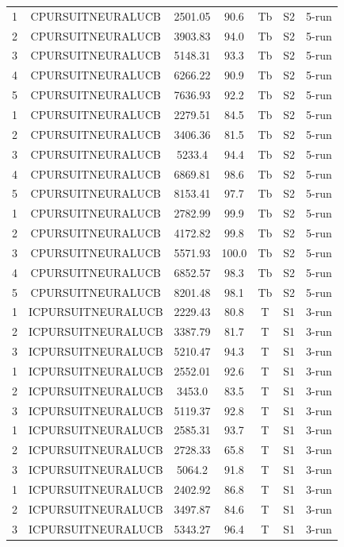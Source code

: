 \documentclass[11pt]{article}
\begin{document}
\begin{center}
\begin{longtable}{|c|c|c|c|c|c|c|}
1 & CPURSUITNEURALUCB & 2501.05 & 90.6 & Tb & S2 & 5-run \\
2 & CPURSUITNEURALUCB & 3903.83 & 94.0 & Tb & S2 & 5-run \\
3 & CPURSUITNEURALUCB & 5148.31 & 93.3 & Tb & S2 & 5-run \\
4 & CPURSUITNEURALUCB & 6266.22 & 90.9 & Tb & S2 & 5-run \\
5 & CPURSUITNEURALUCB & 7636.93 & 92.2 & Tb & S2 & 5-run \\
1 & CPURSUITNEURALUCB & 2279.51 & 84.5 & Tb & S2 & 5-run \\
2 & CPURSUITNEURALUCB & 3406.36 & 81.5 & Tb & S2 & 5-run \\
3 & CPURSUITNEURALUCB & 5233.4 & 94.4 & Tb & S2 & 5-run \\
4 & CPURSUITNEURALUCB & 6869.81 & 98.6 & Tb & S2 & 5-run \\
5 & CPURSUITNEURALUCB & 8153.41 & 97.7 & Tb & S2 & 5-run \\
1 & CPURSUITNEURALUCB & 2782.99 & 99.9 & Tb & S2 & 5-run \\
2 & CPURSUITNEURALUCB & 4172.82 & 99.8 & Tb & S2 & 5-run \\
3 & CPURSUITNEURALUCB & 5571.93 & 100.0 & Tb & S2 & 5-run \\
4 & CPURSUITNEURALUCB & 6852.57 & 98.3 & Tb & S2 & 5-run \\
5 & CPURSUITNEURALUCB & 8201.48 & 98.1 & Tb & S2 & 5-run \\
1 & ICPURSUITNEURALUCB & 2229.43 & 80.8 & T & S1 & 3-run \\
2 & ICPURSUITNEURALUCB & 3387.79 & 81.7 & T & S1 & 3-run \\
3 & ICPURSUITNEURALUCB & 5210.47 & 94.3 & T & S1 & 3-run \\
1 & ICPURSUITNEURALUCB & 2552.01 & 92.6 & T & S1 & 3-run \\
2 & ICPURSUITNEURALUCB & 3453.0 & 83.5 & T & S1 & 3-run \\
3 & ICPURSUITNEURALUCB & 5119.37 & 92.8 & T & S1 & 3-run \\
1 & ICPURSUITNEURALUCB & 2585.31 & 93.7 & T & S1 & 3-run \\
2 & ICPURSUITNEURALUCB & 2728.33 & 65.8 & T & S1 & 3-run \\
3 & ICPURSUITNEURALUCB & 5064.2 & 91.8 & T & S1 & 3-run \\
1 & ICPURSUITNEURALUCB & 2402.92 & 86.8 & T & S1 & 3-run \\
2 & ICPURSUITNEURALUCB & 3497.87 & 84.6 & T & S1 & 3-run \\
3 & ICPURSUITNEURALUCB & 5343.27 & 96.4 & T & S1 & 3-run \\

\end{longtable}
\end{center}
\end{document}
